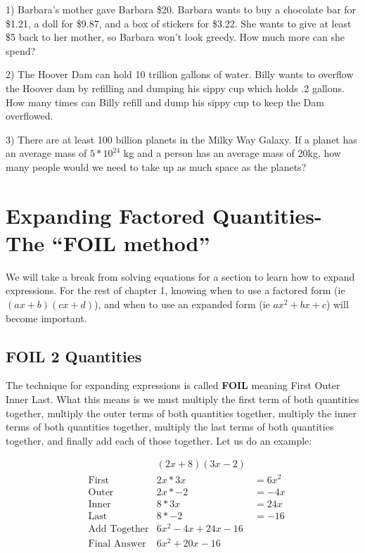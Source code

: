 \documentclass{book}
\theoremstyle{definition}
\begin{document}
1)  Barbara’s mother gave Barbara \$20. Barbara wants to buy a chocolate bar for \$1.21, a doll for \$9.87, and a box of stickers for \$3.22. She wants to give at least \$5 back to her mother, so Barbara won’t look greedy. How much more can she spend?

2) The Hoover Dam can hold 10 trillion gallons of water. Billy wants to overflow the Hoover dam by refilling and dumping his sippy cup which holds .2 gallons. How many times can Billy refill and dump his sippy cup to keep the Dam overflowed.

3) There are at least 100 billion planets in the Milky Way Galaxy. If a planet has an average mass of $5*10^{24}$ kg and a person has an average mass of 20kg, how many people would we need to take up as much space as the planets?

\newpage
\section{Expanding Factored Quantities- The ``FOIL method''}

We will take a break from solving equations for a section to learn how to expand expressions. For the rest of chapter 1, knowing when to use a factored form (ie $(ax+b)(cx+d)$), and when to use an expanded form (ie $ax^2+bx+c$) will become important.
\subsection{FOIL 2 Quantities}
The technique for expanding expressions is called \textbf{FOIL} meaning First Outer Inner Last. What this means is we must multiply the first term of both quantities together, multiply the outer terms of both quantities together, multiply the inner terms of both quantities together,  multiply the last terms of both quantities together, and finally add each of those together. Let us do an example:

\begin{align*}\label{(5.1)}
&       &(2x+8)(3x-2)& \\
&\text{First}  &2x*3x&=6x^2 \\
&\text{Outer}  &2x*-2&=-4x \\
&\text{Inner}  &8*3x&=24x \\
&\text{Last}   &8*-2&=-16 \\
&\text{Add Together} &6x^2-4x+24x-16& \\
&\text{Final Answer} &6x^2+20x-16&
\end{align*}
\end{document}
